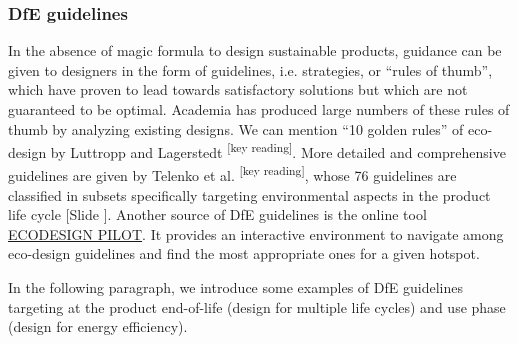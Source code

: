 \documentclass{article}
\newcounter{slide}
\begin{document}
\subsubsection{DfE guidelines}
\label{sec:guidelines}
In the absence of magic formula to design sustainable products, guidance can be given to designers in the form of guidelines, i.e. strategies, or ``rules of thumb'', which have proven to lead towards satisfactory solutions but which are not guaranteed to be optimal. Academia has produced large numbers of these rules of thumb by analyzing existing designs. We can mention ``10 golden rules'' of eco-design by Luttropp and Lagerstedt \cite{luttroppEcoDesignTenGolden2006a}\textsuperscript{\color{Magenta}[key reading]}. More detailed and comprehensive guidelines are given by Telenko et al. \cite{telenkoCompilationDesignEnvironment2016a}\textsuperscript{\color{Magenta}[key reading]}, whose 76 guidelines are classified in subsets specifically targeting environmental aspects in the product life cycle {\color{blue}[Slide ]}. Another source of DfE guidelines is the online tool \href{http://pilot.ecodesign.at/pilot/ONLINE/ENGLISH/INDEX.HTM}{ECODESIGN PILOT}. It provides an interactive environment to navigate among eco-design guidelines and find the most appropriate ones for a given hotspot. 

In the following paragraph, we introduce some examples of DfE guidelines targeting at the product end-of-life (design for multiple life cycles) and use phase (design for energy efficiency).
\end{document}
